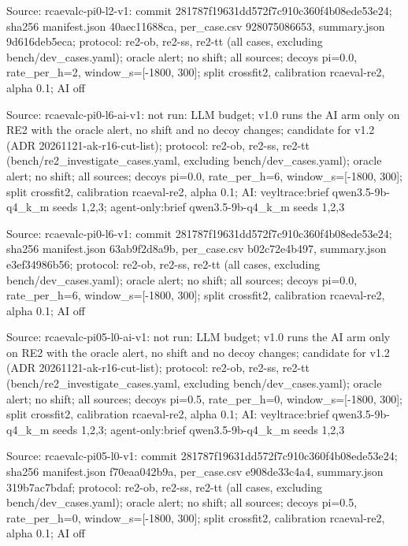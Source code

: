 \noindent Source: rcaevalc-pi0-l2-v1: commit 281787f19631dd572f7c910c360f4b08ede53e24; sha256 manifest.json 40aec11688ca, per\_case.csv 928075086653, summary.json 9d616deb5eca; protocol: re2-ob, re2-ss, re2-tt (all cases, excluding bench/\allowbreak{}dev\_cases.yaml); oracle alert; no shift; all sources; decoys pi=0.0, rate\_per\_h=2, window\_s=[-1800, 300]; split crossfit2, calibration rcaeval-re2, alpha 0.1; AI off\par
\noindent Source: rcaevalc-pi0-l6-ai-v1: not run: LLM budget; v1.0 runs the AI arm only on RE2 with the oracle alert, no shift and no decoy changes; candidate for v1.2 (ADR 20261121-ak-r16-cut-list); protocol: re2-ob, re2-ss, re2-tt (bench/\allowbreak{}re2\_investigate\_cases.yaml, excluding bench/\allowbreak{}dev\_cases.yaml); oracle alert; no shift; all sources; decoys pi=0.0, rate\_per\_h=6, window\_s=[-1800, 300]; split crossfit2, calibration rcaeval-re2, alpha 0.1; AI: veyltrace:brief qwen3.5-9b-q4\_k\_m seeds 1,2,3; agent-only:brief qwen3.5-9b-q4\_k\_m seeds 1,2,3\par
\noindent Source: rcaevalc-pi0-l6-v1: commit 281787f19631dd572f7c910c360f4b08ede53e24; sha256 manifest.json 63ab9f2d8a9b, per\_case.csv b02c72e4b497, summary.json e3ef34986b56; protocol: re2-ob, re2-ss, re2-tt (all cases, excluding bench/\allowbreak{}dev\_cases.yaml); oracle alert; no shift; all sources; decoys pi=0.0, rate\_per\_h=6, window\_s=[-1800, 300]; split crossfit2, calibration rcaeval-re2, alpha 0.1; AI off\par
\noindent Source: rcaevalc-pi05-l0-ai-v1: not run: LLM budget; v1.0 runs the AI arm only on RE2 with the oracle alert, no shift and no decoy changes; candidate for v1.2 (ADR 20261121-ak-r16-cut-list); protocol: re2-ob, re2-ss, re2-tt (bench/\allowbreak{}re2\_investigate\_cases.yaml, excluding bench/\allowbreak{}dev\_cases.yaml); oracle alert; no shift; all sources; decoys pi=0.5, rate\_per\_h=0, window\_s=[-1800, 300]; split crossfit2, calibration rcaeval-re2, alpha 0.1; AI: veyltrace:brief qwen3.5-9b-q4\_k\_m seeds 1,2,3; agent-only:brief qwen3.5-9b-q4\_k\_m seeds 1,2,3\par
\noindent Source: rcaevalc-pi05-l0-v1: commit 281787f19631dd572f7c910c360f4b08ede53e24; sha256 manifest.json f70eaa042b9a, per\_case.csv e908de33c4a4, summary.json 319b7ac7bdaf; protocol: re2-ob, re2-ss, re2-tt (all cases, excluding bench/\allowbreak{}dev\_cases.yaml); oracle alert; no shift; all sources; decoys pi=0.5, rate\_per\_h=0, window\_s=[-1800, 300]; split crossfit2, calibration rcaeval-re2, alpha 0.1; AI off\par
